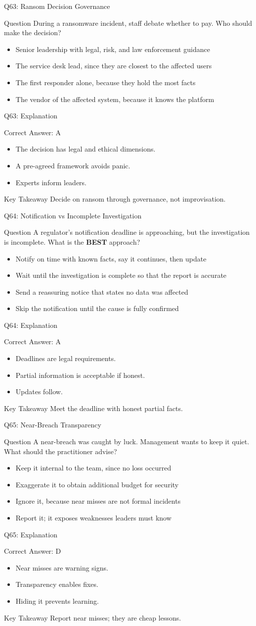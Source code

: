 \documentclass[aspectratio=169]{beamer}
\newcommand{\hq}[7]{%
	\begin{frame}{Q#1: #2}
		\begin{block}{Question}
			#3
		\end{block}
		\begin{itemize}
			#4
		\end{itemize}
	\end{frame}
	\begin{frame}{Q#1: Explanation}
		\begin{block}{Correct Answer: #5}
			\begin{itemize}
				#6
			\end{itemize}
		\end{block}
		\begin{alertblock}{Key Takeaway}
			#7
		\end{alertblock}
	\end{frame}
}
\begin{document}
	\hq{63}{Ransom Decision Governance}
	{During a ransomware incident, staff debate whether to pay. Who should make the decision?}
	{\item[\textbf{(A)}] Senior leadership with legal, risk, and law enforcement guidance
		\item[\textbf{(B)}] The service desk lead, since they are closest to the affected users
		\item[\textbf{(C)}] The first responder alone, because they hold the most facts
		\item[\textbf{(D)}] The vendor of the affected system, because it knows the platform}
	{A}
	{\item The decision has legal and ethical dimensions.
		\item A pre-agreed framework avoids panic.
		\item Experts inform leaders.}
	{Decide on ransom through governance, not improvisation.}

	\hq{64}{Notification vs Incomplete Investigation}
	{A regulator's notification deadline is approaching, but the investigation is incomplete. What is the \textbf{BEST} approach?}
	{\item[\textbf{(A)}] Notify on time with known facts, say it continues, then update
		\item[\textbf{(B)}] Wait until the investigation is complete so that the report is accurate
		\item[\textbf{(C)}] Send a reassuring notice that states no data was affected
		\item[\textbf{(D)}] Skip the notification until the cause is fully confirmed}
	{A}
	{\item Deadlines are legal requirements.
		\item Partial information is acceptable if honest.
		\item Updates follow.}
	{Meet the deadline with honest partial facts.}

	\hq{65}{Near-Breach Transparency}
	{A near-breach was caught by luck. Management wants to keep it quiet. What should the practitioner advise?}
	{\item[\textbf{(A)}] Keep it internal to the team, since no loss occurred
		\item[\textbf{(B)}] Exaggerate it to obtain additional budget for security
		\item[\textbf{(C)}] Ignore it, because near misses are not formal incidents
		\item[\textbf{(D)}] Report it; it exposes weaknesses leaders must know}
	{D}
	{\item Near misses are warning signs.
		\item Transparency enables fixes.
		\item Hiding it prevents learning.}
	{Report near misses; they are cheap lessons.}
\end{document}
